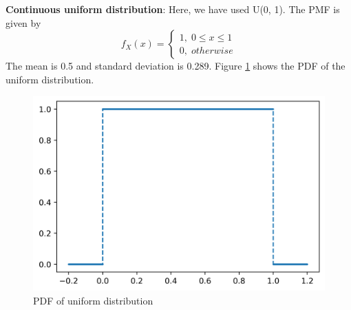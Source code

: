 \documentclass{beamer}
\begin{document}
\begin{frame}{}
 \textbf{Continuous uniform distribution}: Here, we have used U(0, 1). The PMF is given by $$f_X(x) = \begin{cases}1,\; 0 \le x \le 1 \\ 0,\; otherwise\end{cases}$$ 
    The mean is 0.5 and standard deviation is 0.289. Figure \ref{uni_pdf} shows the PDF of the uniform distribution.
\end{frame}
\begin{frame}{}
    \begin{figure}[H]
        \centering
        \includegraphics[scale=0.5]{images/uniform.png}
        \caption{PDF of uniform distribution}
        \label{uni_pdf}
    \end{figure}
\end{frame}
\end{document}
